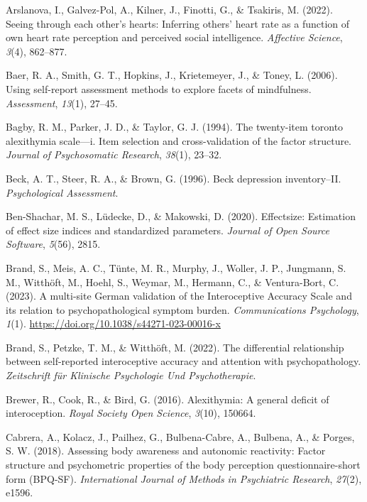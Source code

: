 \documentclass[
  man,
  floatsintext,
  longtable,
  nolmodern,
  notxfonts,
  notimes,
  colorlinks=true,linkcolor=blue,citecolor=blue,urlcolor=blue]{apa7}
\newlength{\cslhangindent}
\newenvironment{CSLReferences}[2] %
 {\begin{list}{}{%
  \setlength{\itemindent}{0pt}
  \setlength{\leftmargin}{0pt}
  \setlength{\parsep}{0pt}
  \ifodd #1
   \setlength{\leftmargin}{\cslhangindent}
   \setlength{\itemindent}{-1\cslhangindent}
  \fi
  \setlength{\itemsep}{#2\baselineskip}}}
 {\end{list}}
\begin{document}
\label{refs}
\begin{CSLReferences}{1}{0}
Arslanova, I., Galvez-Pol, A., Kilner, J., Finotti, G., \& Tsakiris, M.
(2022). Seeing through each other's hearts: Inferring others' heart rate
as a function of own heart rate perception and perceived social
intelligence. \emph{Affective Science}, \emph{3}(4), 862--877.

Baer, R. A., Smith, G. T., Hopkins, J., Krietemeyer, J., \& Toney, L.
(2006). Using self-report assessment methods to explore facets of
mindfulness. \emph{Assessment}, \emph{13}(1), 27--45.

Bagby, R. M., Parker, J. D., \& Taylor, G. J. (1994). The twenty-item
toronto alexithymia scale---i. Item selection and cross-validation of
the factor structure. \emph{Journal of Psychosomatic Research},
\emph{38}(1), 23--32.

Beck, A. T., Steer, R. A., \& Brown, G. (1996). Beck depression
inventory--II. \emph{Psychological Assessment}.

Ben-Shachar, M. S., Lüdecke, D., \& Makowski, D. (2020). Effectsize:
Estimation of effect size indices and standardized parameters.
\emph{Journal of Open Source Software}, \emph{5}(56), 2815.

Brand, S., Meis, A. C., Tünte, M. R., Murphy, J., Woller, J. P.,
Jungmann, S. M., Witthöft, M., Hoehl, S., Weymar, M., Hermann, C., \&
Ventura-Bort, C. (2023). A multi-site German validation of the
Interoceptive Accuracy Scale and its relation to psychopathological
symptom burden. \emph{Communications Psychology}, \emph{1}(1).
\url{https://doi.org/10.1038/s44271-023-00016-x}

Brand, S., Petzke, T. M., \& Witthöft, M. (2022). The differential
relationship between self-reported interoceptive accuracy and attention
with psychopathology. \emph{Zeitschrift f{ü}r Klinische Psychologie Und
Psychotherapie}.

Brewer, R., Cook, R., \& Bird, G. (2016). Alexithymia: A general deficit
of interoception. \emph{Royal Society Open Science}, \emph{3}(10),
150664.

Cabrera, A., Kolacz, J., Pailhez, G., Bulbena-Cabre, A., Bulbena, A., \&
Porges, S. W. (2018). Assessing body awareness and autonomic reactivity:
Factor structure and psychometric properties of the body perception
questionnaire-short form (BPQ-SF). \emph{International Journal of
Methods in Psychiatric Research}, \emph{27}(2), e1596.


\end{CSLReferences}
\end{document}
